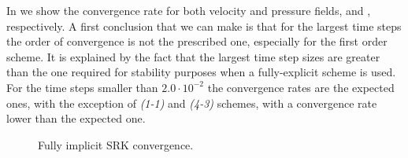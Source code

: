 In  we show the convergence rate for both velocity and pressure fields,  and  , respectively. A first conclusion that we can make is that for the largest time steps the order of convergence is not the prescribed one, especially for the first order scheme. It is explained by the fact that the largest time step sizes are greater than the one required for stability purposes when a fully-explicit scheme is used. %
 For the time steps smaller than $2.0\cdot10^{-2}$ the convergence rates are the expected ones, with the exception of \textit{(1-1)} and \textit{(4-3)} schemes, with a convergence rate lower than the expected one.
\begin{figure}[h!]
  \centering
  \caption{Fully implicit SRK convergence.}
  \label{fig-IMEX_RK_cyl_conv}
\end{figure}
